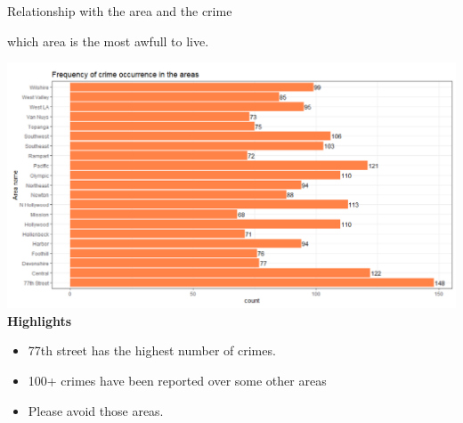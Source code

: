 \documentclass{beamer}\usepackage[]{graphicx}\usepackage[]{xcolor}
\makeatletter
\def\maxwidth{ %
  \ifdim\Gin@nat@width>\linewidth
    \linewidth
  \else
    \Gin@nat@width
  \fi
}
\newenvironment{knitrout}{}{} %
\makeatother
\begin{document}
\begin{frame}[fragile]{Relationship with the area and the crime}

which area is the most awfull to live.

\begin{knitrout}
\color{fgcolor}
\includegraphics[width=\maxwidth]{figure/place.png} 
\end{knitrout}
\textbf{Highlights}
\begin{itemize}
\item 77th street has the highest number of crimes.
\item 100+ crimes have been reported over some other areas
\item Please avoid those areas.

\end{itemize}
\end{frame}
\end{document}
